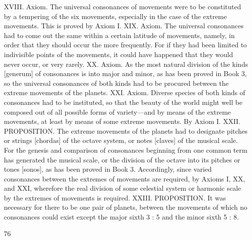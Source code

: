 \documentclass{article}
\begin{document}
XVIII. Axiom. The universal consonances of movements were to be
constituted by a tempering of the six movements, especially in the case of
the extreme movements.
This is proved by Axiom I.
XIX. Axiom. The universal consonances had to come out the same within
a certain latitude of movements, namely, in order that they should occur
the more frequently.
For if they had been limited to indivisible points of the movements, it
could have happened that they would never occur, or very rarely.
XX. Axiom. As the most natural division of the kinds [generum] of
consonances is into major and minor, as has been proved in Book 3, so
the universal consonances of both kinds had to be procured between the
extreme movements of the planets.
XXI. Axiom. Diverse species of both kinds of consonances had to be
instituted, so that the beauty of the world might well be composed out of
all possible forms of variety—and by means of the extreme movements,
at least by means of some extreme movements.
By Axiom I.
XXII. PROPOSITION. The extreme movements of the planets had to
designate pitches or strings [chordas] of the octave system, or
notes [claves] of the musical scale.
For the genesis and comparison of consonances beginning from one
common term has generated the musical scale, or the division of the
octave into its pitches or tones [sonos], as has been proved in Book 3.
Accordingly, since varied consonances between the extremes of
movements are required, by Axioms I, XX, and XXI, wherefore the real
division of some celestial system or harmonic scale by the extremes of
movements is required.
XXIII. PROPOSITION. It was necessary for there to be one pair of
planets, between the movements of which no consonances could exist
except the major sixth 3 : 5 and the minor sixth 5 : 8.


76
\end{document}
